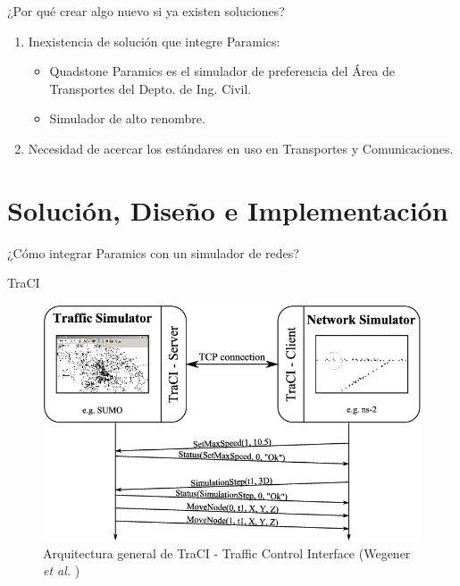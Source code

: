 \documentclass[aspectratio=169]{beamer}
\begin{document}
\begin{frame}{¿Por qué crear algo nuevo si ya existen soluciones?}
\begin{enumerate}
    \item Inexistencia de solución que integre Paramics:\pause
    \begin{itemize}
        \item Quadstone Paramics es el simulador de preferencia del Área de Transportes del Depto. de Ing. Civil.
        \item Simulador de alto renombre.\pause
    \end{itemize}
    \item Necesidad de acercar los estándares en uso en Transportes y Comunicaciones.
\end{enumerate}
\end{frame}


\section{Solución, Diseño e Implementación}
\begin{frame}[standout]
\centering
¿Cómo integrar Paramics con un simulador de redes?
\end{frame}

\begin{frame}{TraCI}
\begin{figure}
    \centering
    \includegraphics[width=.7\linewidth]{figuras/traci-arch.png}
    \caption{Arquitectura general de TraCI - Traffic Control Interface (Wegener \emph{et al.} \autocite{traci})}
    \label{fig:traci}
\end{figure}

\end{frame}
\end{document}
